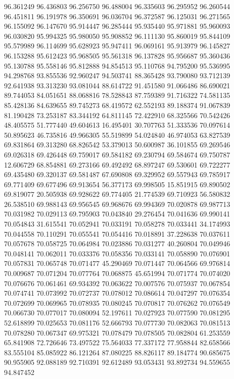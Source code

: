 96.361249
96.436803
96.256750
96.488004
96.335603
96.295952
96.260544
96.451811
96.191978
96.350691
96.036704
96.372587
96.125031
96.271565
96.155092
96.147670
95.914447
96.285444
95.935440
95.971881
95.960093
96.030820
95.994325
95.980050
95.908852
96.111130
95.860019
95.844109
95.579989
96.114699
95.628923
95.947411
96.069161
95.913979
96.145827
96.153288
95.612423
95.968505
95.561318
96.137828
95.956687
95.360436
95.130788
95.558146
95.812888
94.854513
95.110768
94.795200
95.536995
94.298768
93.855536
92.960247
94.503741
88.365428
93.790080
93.712139
92.641938
93.313230
93.081044
88.614722
91.451580
91.066486
86.690021
89.744053
84.051651
88.068816
78.528843
87.759389
91.716322
74.581135
85.428136
84.639655
89.745273
68.419572
62.552193
89.188374
91.067839
81.190428
73.253187
83.344192
64.811145
72.422910
68.325566
70.542426
48.405575
51.777440
49.604613
16.495401
30.707763
51.333536
70.097614
50.895623
46.735816
49.966305
55.519899
54.024840
46.974053
63.827539
69.831864
69.313280
68.826542
53.379013
50.600987
36.101855
69.269546
69.026318
69.426448
69.759017
69.584182
69.230794
69.584674
69.750787
12.606729
68.854881
69.273166
69.492492
68.897247
69.530601
69.722277
69.435480
69.320137
69.581487
67.690808
69.329952
69.557943
69.785917
69.771409
69.677496
69.913654
56.377173
69.998505
15.851915
69.890502
69.819077
20.505938
69.928622
69.774405
21.774539
69.710923
56.580832
26.538510
69.988143
69.956545
69.968676
69.994369
70.020878
69.987713
70.031982
70.029113
69.795903
70.043840
29.276454
70.041636
69.990141
70.054843
31.615541
70.052941
70.033191
70.058278
70.033441
34.174993
70.044558
70.110291
70.055541
70.054416
70.018891
37.228638
70.037611
70.057678
70.058725
70.064984
70.023886
70.031277
40.260804
70.049946
70.048141
70.062011
70.033376
70.058356
70.033141
70.058890
70.076901
70.057831
70.065748
70.071477
45.290469
70.071447
70.064566
69.976814
70.009687
70.071204
70.077764
70.068875
45.651994
70.071774
70.074020
70.076676
70.061461
69.934392
70.063622
70.007576
70.075937
70.067854
70.074741
70.073992
70.072737
70.078012
70.086614
70.047297
70.076354
70.072699
70.069965
70.078935
70.080245
70.070817
70.076262
70.076549
70.066730
70.077017
70.080094
52.197611
70.027923
70.077590
70.081295
52.618899
70.025653
70.081176
52.666793
70.077730
70.082063
70.081513
70.078280
70.067347
69.975321
70.078479
70.078505
70.082804
61.253559
65.841908
72.726646
73.497522
75.564033
77.337172
77.958844
82.658566
83.555104
85.085922
86.121264
87.080225
88.826117
89.184774
90.685675
90.955905
92.088189
92.710391
92.612489
93.053431
93.892734
94.559655
94.847452
